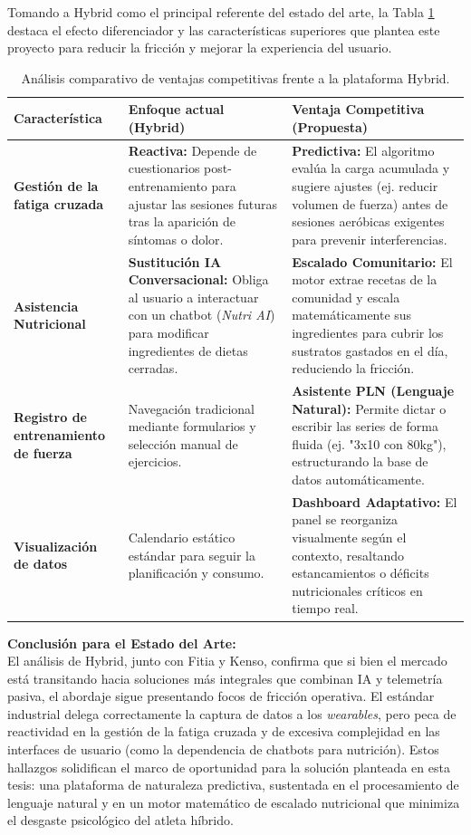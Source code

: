 \documentclass[12pt]{article}
\begin{document}
Tomando a Hybrid como el principal referente del estado del arte, la Tabla \ref{tab:analisis_hybrid} destaca el efecto diferenciador y las características superiores que plantea este proyecto para reducir la fricción y mejorar la experiencia del usuario.
\\
\begin{table}[h!]
    \centering
    \renewcommand{\arraystretch}{1.5}
    \begin{tabular}{|m{3.5cm}|m{5.5cm}|m{5.5cm}|}
        \hline
        \rowcolor[HTML]{EFEFEF}
        \textbf{Característica} & \textbf{Enfoque actual (Hybrid)} & \textbf{Ventaja Competitiva (Propuesta)} \\ \hline
        \textbf{Gestión de la fatiga cruzada} & \textbf{Reactiva:} Depende de cuestionarios post-entrenamiento para ajustar las sesiones futuras tras la aparición de síntomas o dolor. & \textbf{Predictiva:} El algoritmo evalúa la carga acumulada y sugiere ajustes (ej. reducir volumen de fuerza) antes de sesiones aeróbicas exigentes para prevenir interferencias. \\ \hline
        \textbf{Asistencia Nutricional} & \textbf{Sustitución IA Conversacional:} Obliga al usuario a interactuar con un chatbot (\textit{Nutri AI}) para modificar ingredientes de dietas cerradas. & \textbf{Escalado Comunitario:} El motor extrae recetas de la comunidad y escala matemáticamente sus ingredientes para cubrir los sustratos gastados en el día, reduciendo la fricción. \\ \hline
        \textbf{Registro de entrenamiento de fuerza} & Navegación tradicional mediante formularios y selección manual de ejercicios. & \textbf{Asistente PLN (Lenguaje Natural):} Permite dictar o escribir las series de forma fluida (ej. "3x10 con 80kg"), estructurando la base de datos automáticamente. \\ \hline
        \textbf{Visualización de datos} & Calendario estático estándar para seguir la planificación y consumo. & \textbf{Dashboard Adaptativo:} El panel se reorganiza visualmente según el contexto, resaltando estancamientos o déficits nutricionales críticos en tiempo real. \\ \hline
    \end{tabular}
    \caption{Análisis comparativo de ventajas competitivas frente a la plataforma Hybrid.}
    \label{tab:analisis_hybrid}
\end{table}
\newpage
\textbf{Conclusión para el Estado del Arte:}
\\
El análisis de Hybrid, junto con Fitia y Kenso, confirma que si bien el mercado está transitando hacia soluciones más integrales que combinan IA y telemetría pasiva, el abordaje sigue presentando focos de fricción operativa. El estándar industrial delega correctamente la captura de datos a los \textit{wearables}, pero peca de reactividad en la gestión de la fatiga cruzada y de excesiva complejidad en las interfaces de usuario (como la dependencia de chatbots para nutrición). Estos hallazgos solidifican el marco de oportunidad para la solución planteada en esta tesis: una plataforma de naturaleza predictiva, sustentada en el procesamiento de lenguaje natural y en un motor matemático de escalado nutricional que minimiza el desgaste psicológico del atleta híbrido.
\newpage
\end{document}
